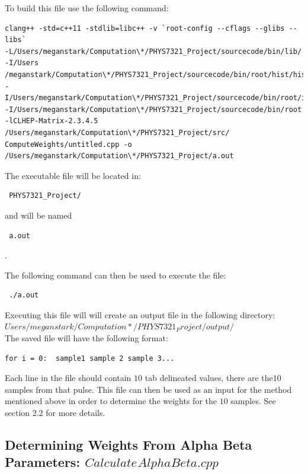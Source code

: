 \documentclass{article}
\begin{document}
To build this file use the following command:

\begin{verbatim} 
clang++ -std=c++11 -stdlib=libc++ -v `root-config --cflags --glibs --libs` 
-L/Users/meganstark/Computation\*/PHYS7321_Project/sourcecode/bin/lib/ -I/Users
/meganstark/Computation\*/PHYS7321_Project/sourcecode/bin/root/hist/hist/inc/ 
-I/Users/meganstark/Computation\*/PHYS7321_Project/sourcecode/bin/root/include/ 
-I/Users/meganstark/Computation\*/PHYS7321_Project/sourcecode/bin/root 
-lCLHEP-Matrix-2.3.4.5 /Users/meganstark/Computation\*/PHYS7321_Project/src/
ComputeWeights/untitled.cpp -o /Users/meganstark/Computation\*/PHYS7321_Project/a.out
\end{verbatim}


The executable file will be located in: \begin{verbatim} PHYS7321_Project/\end{verbatim}   %
and will be named \begin{verbatim} a.out \end{verbatim}. 

The following command can then be used to execute the file: 
 \begin{verbatim} ./a.out  \end{verbatim} 

Executing this file will will create an output file in the following directory: 
$Users/meganstark/Computation*/PHYS7321_Project/output/$ %
\\ The saved file will have the following format:
\begin{verbatim} 
for i = 0:  sample1 sample 2 sample 3...
\end{verbatim}
Each line in the file should contain $10$ tab delineated values, there are the$ 10$ samples from that pulse.
This file can then be used as an input for the method mentioned above in order to determine the weights for the $10$ samples. See section 2.2 for more details. %

\subsection{Determining Weights From Alpha Beta Parameters: $Calculate_{}AlphaBeta.cpp$}
\end{document}

